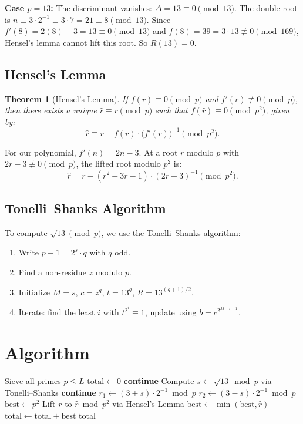 \documentclass[11pt]{article}
\newtheorem{theorem}{Theorem}
\begin{document}
\textbf{Case $p = 13$:}
The discriminant vanishes: $\Delta = 13 \equiv 0 \pmod{13}$. The double root is
$n \equiv 3 \cdot 2^{-1} \equiv 3 \cdot 7 = 21 \equiv 8 \pmod{13}$.
Since $f'(8) = 2(8) - 3 = 13 \equiv 0 \pmod{13}$ and $f(8) = 39 = 3 \cdot 13 \not\equiv 0 \pmod{169}$,
Hensel's lemma cannot lift this root. So $R(13) = 0$.

\subsection{Hensel's Lemma}

\begin{theorem}[Hensel's Lemma]
If $f(r) \equiv 0 \pmod{p}$ and $f'(r) \not\equiv 0 \pmod{p}$, then there exists a unique
$\hat{r} \equiv r \pmod{p}$ such that $f(\hat{r}) \equiv 0 \pmod{p^2}$, given by:
\[
\hat{r} \equiv r - f(r) \cdot \bigl(f'(r)\bigr)^{-1} \pmod{p^2}.
\]
\end{theorem}

For our polynomial, $f'(n) = 2n - 3$. At a root $r$ modulo $p$ with $2r - 3 \not\equiv 0 \pmod{p}$,
the lifted root modulo $p^2$ is:
\[
\hat{r} = r - (r^2 - 3r - 1) \cdot (2r - 3)^{-1} \pmod{p^2}.
\]

\subsection{Tonelli--Shanks Algorithm}

To compute $\sqrt{13} \pmod{p}$, we use the Tonelli--Shanks algorithm:
\begin{enumerate}
    \item Write $p - 1 = 2^s \cdot q$ with $q$ odd.
    \item Find a non-residue $z$ modulo $p$.
    \item Initialize $M = s$, $c = z^q$, $t = 13^q$, $R = 13^{(q+1)/2}$.
    \item Iterate: find the least $i$ with $t^{2^i} \equiv 1$, update using $b = c^{2^{M-i-1}}$.
\end{enumerate}

\section{Algorithm}

\begin{algorithm}[H]
\caption{Compute $\text{SR}(L)$}
\begin{algorithmic}[1]
\State Sieve all primes $p \leq L$
\State $\text{total} \gets 0$
     \textbf{continue} \EndIf
    \State Compute $s \gets \sqrt{13} \bmod p$ via Tonelli--Shanks
     \textbf{continue} \EndIf
    \State $r_1 \gets (3 + s) \cdot 2^{-1} \bmod p$
    \State $r_2 \gets (3 - s) \cdot 2^{-1} \bmod p$
    \State $\text{best} \gets p^2$
        \State Lift $r$ to $\hat{r} \bmod p^2$ via Hensel's Lemma
        \State $\text{best} \gets \min(\text{best}, \hat{r})$
    \EndFor
    \State $\text{total} \gets \text{total} + \text{best}$
\EndFor
\State \Return total
\end{algorithmic}
\end{algorithm}
\end{document}
